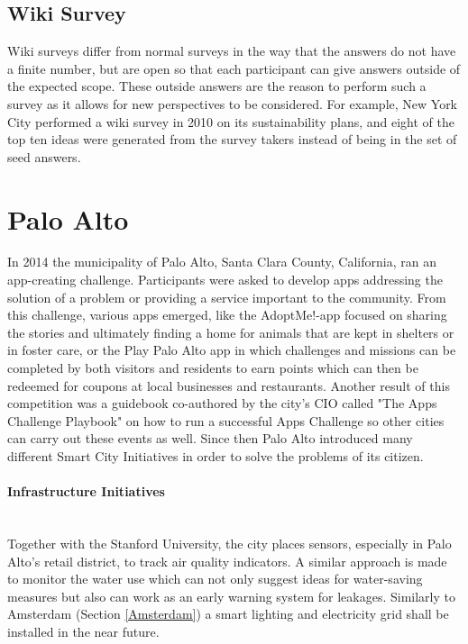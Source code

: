 \documentclass[a4paper,12pt]{report}
\begin{document}
		\subsection[Wiki Survey]{Wiki Survey \cite{BitbyBit}}
		\startsubsection
			Wiki surveys differ from normal surveys in the way that the answers do not have a finite number, but are open so that each participant can give answers outside of the expected scope. 
			These outside answers are the reason to perform such a survey as it allows for new perspectives to be considered. 
			For example, New York City performed a wiki survey in 2010 on its sustainability plans, and eight of the top ten ideas were generated from the survey takers instead of being in the set of seed answers.
		\closesection
	\closesection
	
	\section[Palo Alto]{Palo Alto \cite{SmartCityPaloAlto}}
	\startsection
		In 2014 the municipality of Palo Alto, Santa Clara County, California, ran an app-creating challenge. 
		Participants were asked to develop apps addressing the solution of a problem or providing a service important to the community. 
		From this challenge, various apps emerged, like the AdoptMe!-app focused on sharing the stories and ultimately finding a home for animals that are kept in shelters or in foster care, or the Play Palo Alto app in which challenges and missions can be completed by both visitors and residents to earn points which can then be redeemed for coupons at local businesses and restaurants. 
		Another result of this competition was a guidebook co-authored by the city's CIO called "The Apps Challenge Playbook" \cite{AppsChallengePlaybook} on how to run a successful Apps Challenge so other cities can carry out these events as well. 
		Since then Palo Alto introduced many different Smart City Initiatives in order to solve the problems of its citizen.
		
		\paragraph{Infrastructure Initiatives} \hfill \\
		Together with the Stanford University, the city places sensors, especially in Palo Alto's retail district, to track air quality indicators. 
		A similar approach is made to monitor the water use which can not only suggest ideas for water-saving measures but also can work as an early warning system for leakages. 
		Similarly to Amsterdam (Section \ref{Amsterdam}) a smart lighting and electricity grid shall be installed in the near future.
		
\end{document}
